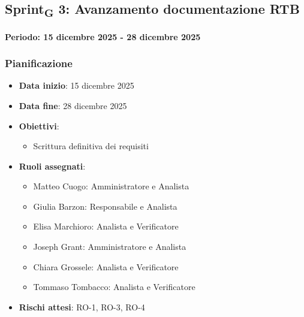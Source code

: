 \documentclass[11pt,a4paper]{article}
\newcommand{\gls}[1]{#1\textsubscript{G}}
\begin{document}
\newpage
\subsection{\gls{Sprint} 3: Avanzamento documentazione RTB}
{\textbf{Periodo: 15 dicembre 2025 - 28 dicembre 2025}\par}

\subsubsection{Pianificazione}
\begin{itemize}
    \item \textbf{Data inizio}: 15 dicembre 2025
    \item \textbf{Data fine}: 28 dicembre 2025
    \item \textbf{Obiettivi}:
    \begin{itemize}
        \item Scrittura definitiva dei requisiti
    \end{itemize}
    
    \item \textbf{Ruoli assegnati}:
    \begin{itemize}
        \item Matteo Cuogo: Amministratore e Analista 
        \item Giulia Barzon: Responsabile e Analista
        \item Elisa Marchioro: Analista e Verificatore
        \item Joseph Grant: Amministratore e Analista
        \item Chiara Grossele: Analista e Verificatore
        \item Tommaso Tombacco: Analista e Verificatore
    \end{itemize}
    
    \item \textbf{Rischi attesi}: RO-1, RO-3, RO-4
\end{itemize}
\end{document}
